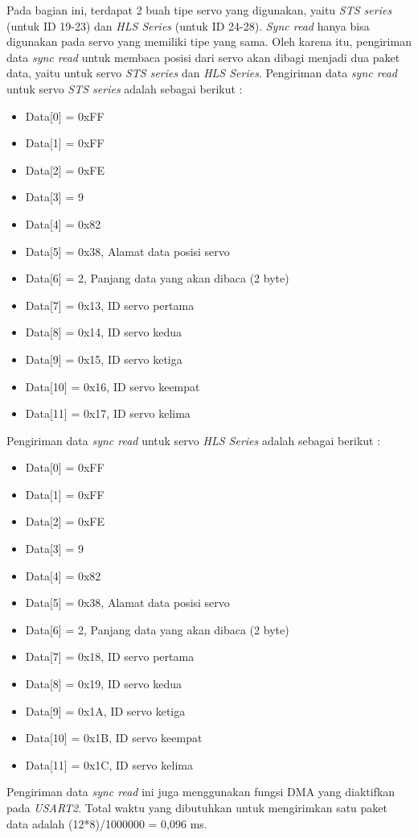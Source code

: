 Pada bagian ini, terdapat 2 buah tipe servo yang digunakan, yaitu \emph{STS
series} (untuk ID 19-23) dan \emph{HLS Series} (untuk ID 24-28). \emph{Sync
read} hanya bisa digunakan pada servo yang memiliki tipe yang sama. Oleh karena
itu, pengiriman data \emph{sync read} untuk membaca posisi dari servo akan
dibagi menjadi dua paket data, yaitu untuk servo \emph{STS series} dan \emph{HLS
Series}. Pengiriman data \emph{sync read} untuk servo \emph{STS series} adalah
sebagai berikut :
\begin{itemize}
    \item Data[0] = 0xFF
    \item Data[1] = 0xFF
    \item Data[2] = 0xFE
    \item Data[3] = 9
    \item Data[4] = 0x82
    \item Data[5] = 0x38, Alamat data posisi servo 
    \item Data[6] = 2, Panjang data yang akan dibaca (2 byte)
    \item Data[7] = 0x13, ID servo pertama
    \item Data[8] = 0x14, ID servo kedua
    \item Data[9] = 0x15, ID servo ketiga
    \item Data[10] = 0x16, ID servo keempat
    \item Data[11] = 0x17, ID servo kelima
\end{itemize}
Pengiriman data \emph{sync read} untuk servo \emph{HLS Series} adalah sebagai berikut :
\begin{itemize}
    \item Data[0] = 0xFF
    \item Data[1] = 0xFF
    \item Data[2] = 0xFE
    \item Data[3] = 9
    \item Data[4] = 0x82
    \item Data[5] = 0x38, Alamat data posisi servo 
    \item Data[6] = 2, Panjang data yang akan dibaca (2 byte)
    \item Data[7] = 0x18, ID servo pertama
    \item Data[8] = 0x19, ID servo kedua
    \item Data[9] = 0x1A, ID servo ketiga
    \item Data[10] = 0x1B, ID servo keempat
    \item Data[11] = 0x1C, ID servo kelima
\end{itemize}
Pengiriman data \emph{sync read} ini juga menggunakan fungsi DMA yang diaktifkan
pada \emph{USART2}. Total waktu yang dibutuhkan untuk mengirimkan satu paket data
adalah (12*8)/1000000 = 0,096 ms.

